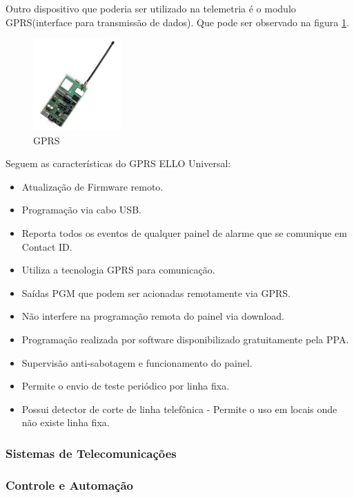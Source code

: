 	Outro dispositivo que poderia ser utilizado na telemetria é o modulo GPRS(interface para transmissão de dados). Que pode ser observado na figura \ref{img:GPRS}.

	\begin{figure}[H]
		\centering
		\includegraphics[width=0.3\textwidth]{figuras/GPRS}
		\caption{GPRS}
		\label{img:GPRS}
	\end{figure}

	Seguem as características do GPRS ELLO Universal:

	\begin{itemize}
		\item Atualização de Firmware remoto.
		\item Programação via cabo USB.
		\item Reporta todos os eventos de qualquer painel de alarme que se comunique em Contact ID.
		\item Utiliza a tecnologia GPRS para comunicação.
		\item Saídas PGM que podem ser acionadas remotamente via GPRS.
		\item Não interfere na programação remota do painel via download.
		\item Programação realizada por software disponibilizado gratuitamente pela PPA.
		\item Supervisão anti-sabotagem e funcionamento do painel.
		\item Permite o envio de teste periódico por linha fixa.
		\item Possui detector de corte de linha telefônica - Permite o uso em locais onde não existe linha fixa.
	\end{itemize}

\subsubsection{Sistemas de Telecomunicações}

\subsubsection{Controle e Automação}

